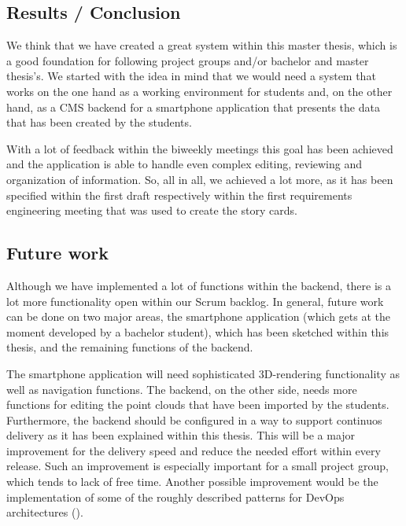 \subsection{Results / Conclusion}
We think that we have created a great system within this master thesis, which is a good foundation for following project groups and/or bachelor and master thesis's. We started with the idea in mind that we would need a system that works on the one hand as a working environment for students and, on the other hand, as a \ac{CMS} backend for a smartphone application that presents the data that has been created by the students. 

With a lot of feedback within the biweekly meetings this goal has been achieved and the application is able to handle even complex editing, reviewing and organization of information. So, all in all, we achieved a lot more, as it has been specified within the first draft respectively within the first requirements engineering meeting that was used to create the story cards.

\subsection{Future work}
\label{futurework}
Although we have implemented a lot of functions within the backend, there is a lot more functionality open within our Scrum backlog. In general, future work can be done on two major areas, the smartphone application (which gets at the moment developed by a bachelor student), which has been sketched within this thesis,  and the remaining functions of the backend. 

The smartphone application will need sophisticated 3D-rendering functionality as well as navigation functions. The backend, on the other side, needs more functions for editing the point clouds that have been imported by the students. Furthermore, the backend should be configured in a way to support continuos delivery as it has been explained within this thesis. This will be a major improvement for the delivery speed and reduce the needed effort within every release. Such an improvement is especially important for a small project group, which tends to lack of free time. Another possible improvement would be the implementation of some of the roughly described patterns for DevOps architectures (\cite{cukier2013devops}).  
